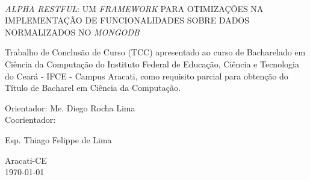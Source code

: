 \vfill
\begin{center}

{\imprimirautor\\}
\vspace{3cm}
{\textsc{\uppercase{\textit{Alpha} \textit{Restful}: Um \textit{Framework} para Otimizações na Implementação de Funcionalidades Sobre Dados Normalizados no \textit{MongoDB}}}\\}
\vspace{5cm}
\hspace{.45\linewidth}
\begin{minipage}{.50\linewidth}
Trabalho de Conclusão de Curso (TCC) apresentado ao curso de Bacharelado em Ciência da Computação do Instituto Federal de Educação, Ciência e Tecnologia do Ceará - IFCE - Campus Aracati, como requisito parcial para obtenção do Título de Bacharel em Ciência da Computação.

\vspace{0.5 cm}

Orientador: Me. Diego Rocha Lima\\
Coorientador: \raggedright{Esp. Thiago Felippe de Lima}

\end{minipage}

\vspace{2cm}
\vfill
{\large Aracati-CE\\\today}

\end{center}
